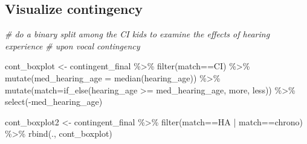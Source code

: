 \documentclass[
]{article}
\newenvironment{Shaded}{\begin{snugshade}}{\end{snugshade}}
\newcommand{\AttributeTok}[1]{\textcolor[rgb]{0.77,0.63,0.00}{#1}}
\newcommand{\CommentTok}[1]{\textcolor[rgb]{0.56,0.35,0.01}{\textit{#1}}}
\newcommand{\FunctionTok}[1]{\textcolor[rgb]{0.00,0.00,0.00}{#1}}
\newcommand{\NormalTok}[1]{#1}
\newcommand{\OtherTok}[1]{\textcolor[rgb]{0.56,0.35,0.01}{#1}}
\newcommand{\SpecialCharTok}[1]{\textcolor[rgb]{0.00,0.00,0.00}{#1}}
\newcommand{\StringTok}[1]{\textcolor[rgb]{0.31,0.60,0.02}{#1}}
\begin{document}
\hypertarget{visualize-contingency}{%
\subsection{Visualize contingency}\label{visualize-contingency}}

\begin{Shaded}
\begin{Highlighting}[]
\CommentTok{\# do a binary split among the CI kids to examine the effects of hearing experience }
\CommentTok{\# upon vocal contingency }

\NormalTok{cont\_boxplot }\OtherTok{\textless{}{-}}\NormalTok{ contingent\_final }\SpecialCharTok{\%\textgreater{}\%} 
  \FunctionTok{filter}\NormalTok{(match}\SpecialCharTok{==}\StringTok{\textquotesingle{}CI\textquotesingle{}}\NormalTok{) }\SpecialCharTok{\%\textgreater{}\%}
  \FunctionTok{mutate}\NormalTok{(}\AttributeTok{med\_hearing\_age =} \FunctionTok{median}\NormalTok{(hearing\_age)) }\SpecialCharTok{\%\textgreater{}\%}
  \FunctionTok{mutate}\NormalTok{(}\AttributeTok{match=}\FunctionTok{if\_else}\NormalTok{(hearing\_age }\SpecialCharTok{\textgreater{}=}\NormalTok{ med\_hearing\_age, }\StringTok{\textquotesingle{}more\textquotesingle{}}\NormalTok{, }\StringTok{\textquotesingle{}less\textquotesingle{}}\NormalTok{)) }\SpecialCharTok{\%\textgreater{}\%}
  \FunctionTok{select}\NormalTok{(}\SpecialCharTok{{-}}\NormalTok{med\_hearing\_age)}

\NormalTok{cont\_boxplot2 }\OtherTok{\textless{}{-}}\NormalTok{ contingent\_final }\SpecialCharTok{\%\textgreater{}\%}
  \FunctionTok{filter}\NormalTok{(match}\SpecialCharTok{==}\StringTok{\textquotesingle{}HA\textquotesingle{}} \SpecialCharTok{|}\NormalTok{ match}\SpecialCharTok{==}\StringTok{\textquotesingle{}chrono\textquotesingle{}}\NormalTok{) }\SpecialCharTok{\%\textgreater{}\%}
  \FunctionTok{rbind}\NormalTok{(., cont\_boxplot)}


\end{Highlighting}
\end{Shaded}
\end{document}
